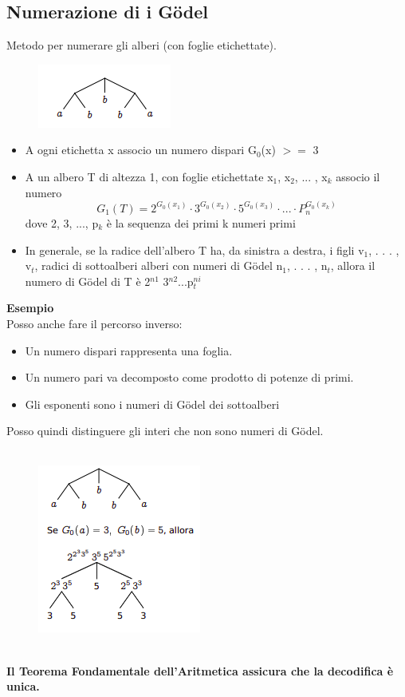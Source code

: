 \subsection{Numerazione di i Gödel}
Metodo per numerare gli alberi (con foglie etichettate).
\begin{figure}[htp]
    \centering
     \includegraphics[scale=1]{tesi_stile/img/goedel.png}
\end{figure}
\begin{itemize}
    \item A ogni etichetta x associo un numero dispari G$_0$(x) $>=$ 3
    
    \item A un albero T di altezza 1, con foglie etichettate x$_1$, x$_2$, ... , x$_k$ associo il numero $$G_1(T) = 2^{G_0(x_1)} \cdot 3^{G_0(x_2)} \cdot 5^{G_0(x_3)} \cdot ... \cdot P_n^{G_0(x_k)}$$ dove 2, 3, ..., p$_k$ è la sequenza dei primi k numeri primi
    
    \item In generale, se la radice dell’albero T ha, da sinistra a destra, i figli v$_1$, . . . , v$_t$, radici di sottoalberi alberi con numeri di Gödel n$_1$, . . . , n$_t$, allora il numero di Gödel di T è 2$^{n1}$ 3$^{n2}$...p$_t^{ni}$
\end{itemize}
\newpage
\textbf{Esempio}\\
Posso anche fare il percorso inverso:
\begin{itemize}
    \item Un numero dispari rappresenta una foglia.
    
    \item Un numero pari va decomposto come prodotto di potenze di primi.
    
    \item Gli esponenti sono i numeri di Gödel dei sottoalberi
\end{itemize}
Posso quindi distinguere gli interi che non sono numeri di Gödel.\\\\
\begin{figure}[htp]
    \centering
     \includegraphics[scale=1]{tesi_stile/img/inverso.png}
\end{figure}\\
\textbf{Il Teorema Fondamentale dell’Aritmetica assicura che la decodifica è unica.}
\newpage
